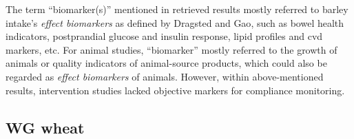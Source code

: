 
The term ``biomarker(s)'' mentioned in retrieved results mostly referred to barley intake's \textit{effect biomarkers} as defined by Dragsted\cite{Dragsted2017} and Gao\cite{Gao2017}, such as bowel health indicators\cite{Bird2008}, postprandial glucose and insulin response\cite{Ames2015}, lipid profiles and \acrfull{cvd} markers\cite{Marungruang2018}, etc. 
For animal studies, ``biomarker'' mostly referred to the growth of animals or quality indicators of animal-source products\cite{ISI:000272990200002,Foster2003}, which could also be regarded as \textit{effect biomarkers} of animals. 
However, within above-mentioned results, intervention studies lacked objective markers for compliance monitoring. 

\subsection{WG wheat}
